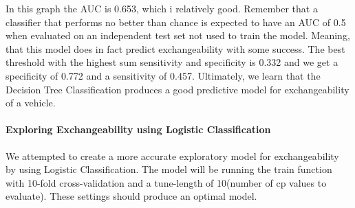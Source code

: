 \documentclass[
]{article}
\begin{document}
In this graph the AUC is 0.653, which i relatively good. Remember that a
classifier that performs no better than chance is expected to have an
AUC of 0.5 when evaluated on an independent test set not used to train
the model. Meaning, that this model does in fact predict exchangeability
with some success. The best threshold with the highest sum sensitivity
and specificity is 0.332 and we get a specificity of 0.772 and a
sensitivity of 0.457. Ultimately, we learn that the Decision Tree
Classification produces a good predictive model for exchangeability of a
vehicle.

\hypertarget{exploring-exchangeability-using-logistic-classification}{%
\paragraph{Exploring Exchangeability using Logistic
Classification}\label{exploring-exchangeability-using-logistic-classification}}

We attempted to create a more accurate exploratory model for
exchangeability by using Logistic Classification. The model will be
running the train function with 10-fold cross-validation and a
tune-length of 10(number of cp values to evaluate). These settings
should produce an optimal model.
\end{document}
